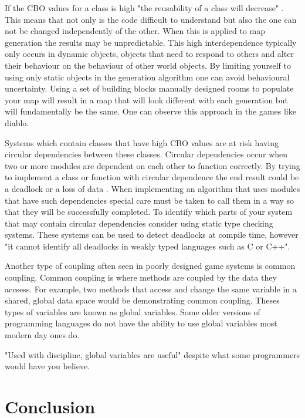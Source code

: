 \documentclass{scrartcl}
\begin{document}
If the CBO values for a class is high "the reusability of a class will decrease" \cite[p. 468]{rathore2011novel}. This means that not only is the code difficult to understand but also the one can not be changed independently of the other. When this is applied to map generation the results may be unpredictable. This high interdependence typically only occurs in dynamic objects, objects that need to respond to others and alter their behaviour on the behaviour of other world objects. By limiting yourself to using only static objects in the generation algorithm one can avoid behavioural uncertainty. Using a set of building blocks manually designed rooms to populate your map will result in a map that will look different with each generation but will fundamentally be the same. One can observe this approach in the games like diablo\cite {togelius2013procedural}. 

Systems which contain classes that have high CBO values are at risk having circular dependencies between these classes. Circular dependencies occur when two or more modules are dependent on each other to function correctly\cite{nair2016solving}. By trying to implement a class or function with circular dependence the end result could be a deadlock or a loss of data \cite {nair2016solving}. When implementing an algorithm that uses modules that have such dependencies special care must be taken to call them in a way so that they will be successfully completed. To identify which parts of your system that may contain circular dependencies consider using static type checking systems\cite{boyapati2002ownership, naik2009effective}. These systems can be used to detect deadlocks at compile time, however "it cannot identify all deadlocks in weakly typed languages such as C or C++"\cite[p.76]{pyla2010avoiding}.

Another type of coupling often seen in poorly designed game systems is common coupling. Common coupling is where methods are coupled by the data they accsess\cite{briand1999unified}. For example, two methods that access and change the same variable in a shared, global data space would be demonstrating common coupling. Theses types of variables are known as global variables. Some older versions of programming languages do not have the ability to use global variables most modern day ones do.

 "Used with discipline, global variables are useful"\cite [p.338]{mcconnell2004code} despite what some programmers would have you believe\cite {wulf1973global}.

\section{Conclusion}





\end{document}
